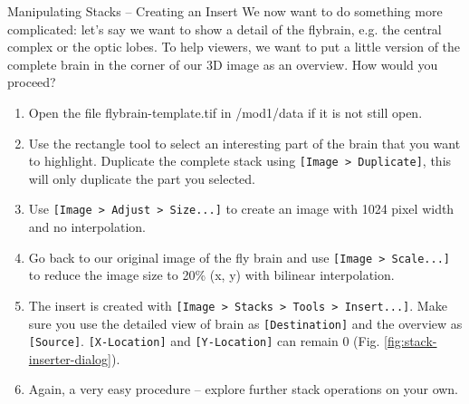 \begin{taskbox}{Manipulating Stacks -- Creating an Insert}
We now want to do something more complicated: let's say we want to show a detail of the flybrain, e.g. the central complex or the optic lobes. To help viewers, we want to put a little version of the complete brain in the corner of our 3D image as an overview. How would you proceed?

\begin{enumerate}
	\item Open the file flybrain-template.tif in /mod1/data if it is not still open.
	\item Use the rectangle tool to select an interesting part of the brain that you want to highlight. Duplicate the complete stack using \texttt{[Image > Duplicate]}, this will only duplicate the part you selected. 
	\item Use \texttt{[Image > Adjust > Size...]} to create an image with 1024 pixel width and no interpolation.
	\item Go back to our original image of the fly brain and use \texttt{[Image > Scale...]} to reduce the image size to 20\% (x, y) with bilinear interpolation.
	\item The insert is created with \texttt{[Image > Stacks > Tools > Insert...]}. Make sure you use the detailed view of brain as \texttt{[Destination]} and the overview as \texttt{[Source]}. \texttt{[X-Location]} and \texttt{[Y-Location]} can remain 0 (Fig. \ref{fig:stack-inserter-dialog}).
	
	\begin{minipage}[t]{\linewidth}
		\begin{center}
		\medskip
		\label{fig:stack-inserter-dialog}
		\end{center}
	\end{minipage}
	
	\item Again, a very easy procedure -- explore further stack operations on your own.
\end{enumerate}

\end{taskbox}


